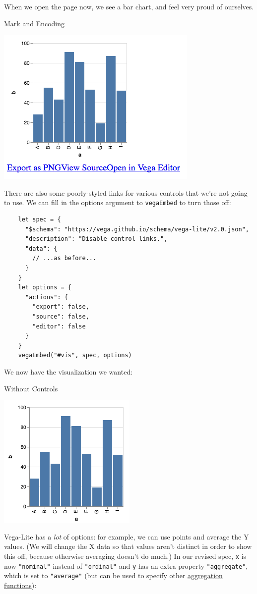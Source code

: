 When we open the page now, we see a bar chart, and feel very proud of
ourselves.

Mark and Encoding

\includegraphics{../../files/vis-mark-encoding.png}

There are also some poorly-styled links for various controls that we're
not going to use. We can fill in the options argument to
\texttt{vegaEmbed} to turn those off:

\begin{verbatim}
    let spec = {
      "$schema": "https://vega.github.io/schema/vega-lite/v2.0.json",
      "description": "Disable control links.",
      "data": {
        // ...as before...
      }
    }
    let options = {
      "actions": {
        "export": false,
        "source": false,
        "editor": false
      }
    }
    vegaEmbed("#vis", spec, options)
\end{verbatim}

We now have the visualization we wanted:

Without Controls

\includegraphics{../../files/vis-disable-controls.png}

Vega-Lite has a \emph{lot} of options: for example, we can use points
and average the Y values. (We will change the X data so that values
aren't distinct in order to show this off, because otherwise averaging
doesn't do much.) In our revised spec, \texttt{x} is now
\texttt{"nominal"} instead of \texttt{"ordinal"} and \texttt{y} has an
extra property \texttt{"aggregate"}, which is set to \texttt{"average"}
(but can be used to specify other
\protect\hyperlink{g:aggregation-function}{aggregation functions}):

